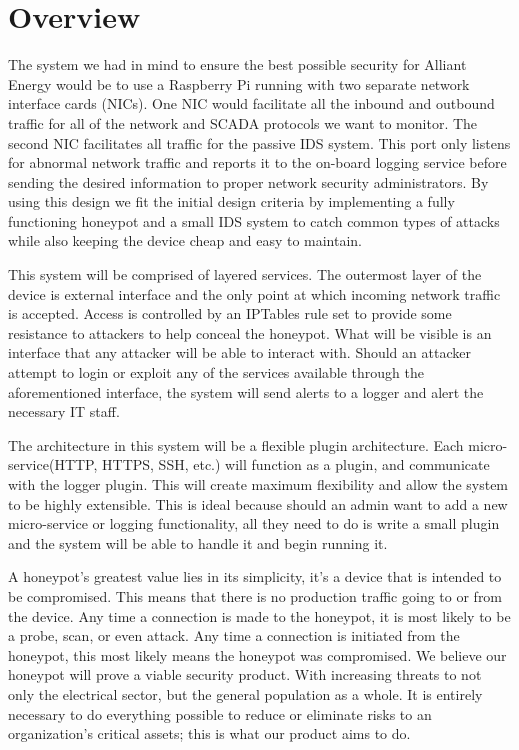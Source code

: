 \section{Overview}
The system we had in mind to ensure the best possible security for Alliant Energy would be to use a Raspberry Pi running with two separate network interface cards (NICs). One NIC would facilitate all the inbound and outbound traffic for all of the network and SCADA protocols we want to monitor. The second NIC facilitates all traffic for the passive IDS system. This port only listens for abnormal network traffic and reports it to the on-board logging service before sending the desired information to proper network security administrators. By using this design we fit the initial design criteria by implementing a fully functioning honeypot and a small IDS system to catch common types of attacks while also keeping the device cheap and easy to maintain.

This system will be comprised of layered services. The outermost layer of the device is external interface and the only point at which incoming network traffic is accepted. Access is controlled by an IPTables rule set to provide some resistance to attackers to help conceal the honeypot. What will be visible is an interface that any attacker will be able to interact with. Should an attacker attempt to login or exploit any of the services available through the aforementioned interface, the system will send alerts to a logger and alert the necessary IT staff.

The architecture in this system will be a flexible plugin architecture. Each micro-service(HTTP, HTTPS, SSH, etc.) will function as a plugin, and communicate with the logger plugin. This will create maximum flexibility and allow the system to be highly extensible. This is ideal because should an admin want to add a new micro-service or logging functionality, all they need to do is write a small plugin and the system will be able to handle it and begin running it.

A honeypot's greatest value lies in its simplicity, it's a device that is intended to be compromised. This means that there is no production traffic going to or from the device. Any time a connection is made to the honeypot, it is most likely to be a probe, scan, or even attack. Any time a connection is initiated from the honeypot, this most likely means the honeypot was compromised. We believe our honeypot will prove a viable security product. With increasing threats to not only the electrical sector, but the general population as a whole. It is entirely necessary to do everything possible to reduce or eliminate risks to an organization's critical assets; this is what our product aims to do.
